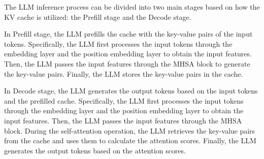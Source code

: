 The LLM inference process can be divided into two main stages based on how the KV cache is utilized: the Prefill stage and the Decode stage.

In Prefill stage, the LLM prefills the cache with the key-value pairs of the input tokens. Specifically, the LLM first processes the input tokens through the embedding layer and the position embedding layer to obtain the input features. Then, the LLM passes the input features through the MHSA block to generate the key-value pairs. Finally, the LLM stores the key-value pairs in the cache.

In Decode stage, the LLM generates the output tokens based on the input tokens and the prefilled cache. Specifically, the LLM first processes the input tokens through the embedding layer and the position embedding layer to obtain the input features. Then, the LLM passes the input features through the MHSA block. During the self-attention operation, the LLM retrieves the key-value pairs from the cache and uses them to calculate the attention scores. Finally, the LLM generates the output tokens based on the attention scores.


